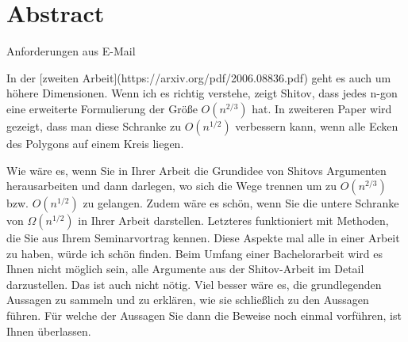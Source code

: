 \section*{Abstract}
{\large
  Anforderungen aus E-Mail
}

In der [zweiten Arbeit](https://arxiv.org/pdf/2006.08836.pdf) geht es auch um höhere Dimensionen. Wenn ich es richtig verstehe, zeigt Shitov, dass jedes n-gon eine erweiterte Formulierung der Größe $O(n^{2/3})$ hat. In zweiteren Paper wird gezeigt, dass man diese Schranke zu $O(n^{1/2})$ verbessern kann, wenn alle Ecken des Polygons auf einem Kreis liegen.

Wie wäre es, wenn Sie in Ihrer Arbeit die Grundidee von Shitovs Argumenten herausarbeiten und dann darlegen, wo sich die Wege trennen um zu $O(n^{2/3})$ bzw. $O(n^{1/2})$ zu gelangen. Zudem wäre es schön, wenn Sie die untere Schranke von $\Omega(n^{1/2})$ in Ihrer Arbeit darstellen. Letzteres funktioniert mit Methoden, die Sie aus Ihrem Seminarvortrag kennen. Diese Aspekte mal alle in einer Arbeit zu haben, würde ich schön finden. Beim Umfang einer Bachelorarbeit wird es Ihnen nicht möglich sein, alle Argumente aus der Shitov-Arbeit im Detail darzustellen. Das ist auch nicht nötig. Viel besser wäre es, die grundlegenden Aussagen zu sammeln und zu erklären, wie sie schließlich zu den Aussagen führen. Für welche der Aussagen Sie dann die Beweise noch einmal vorführen, ist Ihnen überlassen.
